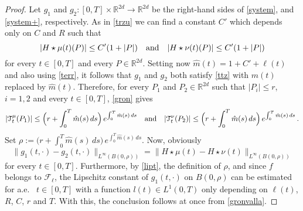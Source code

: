 \documentclass[11pt]{article}
\theoremstyle{plain}
\theoremstyle{definition}
\newtheorem{definition}[theorem]{Definition}
\theoremstyle{remark}
\numberwithin{equation}{section}
\newcommand{\R}{{\mathbb R}}
\newcommand{\PP}{{\mathcal P}_1}
\newcommand{\WW}{{\mathcal W}_1}
\begin{document}
\begin{proof}
Let $g_1$ and $g_2\colon [0,T]\times \R^{2d}\to \R^{2d}$  be the right-hand sides of \eqref{system}, and \eqref{system+}, respectively. As in \eqref{trzu} we can find a constant $C'$ which depends only on $C$ and $R$ such that
\begin{equation}\label{trzu+}
|H\star \mu(t) (P)|\le C'(1+|P|)\quad\hbox{and}\quad|H\star \nu(t) (P)|\le C'(1+|P|)
\end{equation}
for every $t \in [0, T]$ and every $P \in \R^{2d}$. Setting now $\hat m(t)=1+C'+\ell(t)$ and also using \eqref{terr}, it follows that $g_1$ and $g_2$ both satisfy \eqref{ttz} with $m(t)$ replaced by $\hat m(t)$. Therefore, for every $P_1$ and $P_2 \in \R^{2d}$ such that $|P_i|\le r$, $i=1,2$ and every $t\in [0,T]$, \eqref{gron} gives
$$
|{\mathcal T}^\mu_t(P_1)|\le \Big(r+ \int_0^T \hat m(s)\,ds\Big) \,e^{\int_0^T \hat m(s)\,ds}\quad\hbox{and}\quad|{\mathcal T}^\nu_t(P_2)|\le \Big(r+ \int_0^T \hat m(s)\,ds\Big) \,e^{\int_0^T \hat m(s)\,ds}\,.
$$
Set $\rho:=\Big(r+ \int_0^T \hat m(s)\,ds\Big) \,e^{\int_0^T \hat m(s)\,ds}$. Now, obviously
$$
\|g_1(t,\cdot)-g_2(t,\cdot)\|_{L^\infty(B(0,\rho))}=\|H\star \mu(t)-H\star \nu(t)\|_{L^\infty(B(0,\rho))}
$$
for every $t \in [0, T]$. Furthermore, by \eqref{lipt}, the definition of $\rho$, and since $f$ belongs to ${\mathcal F}_\ell$, the Lipschitz constant of $g_1(t, \cdot)$  on $B(0,\rho)$ can be estimated for a.e. \ $t \in [0, T]$  with a function $l(t)\in L^1(0,T)$ only depending on $\ell(t)$, $R$, $C$, $r$ and $T$. With this, the conclusion follows at once from \eqref{gronvalla}.
\end{proof}




\end{document}

